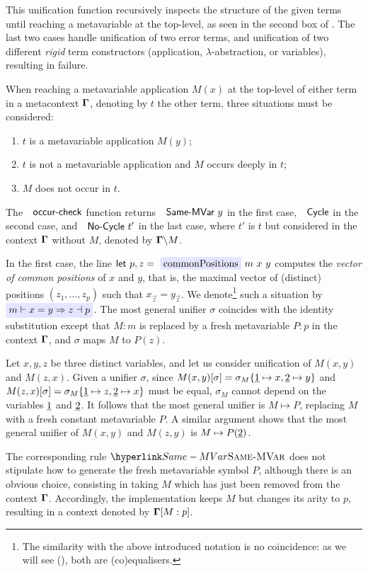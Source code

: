 This unification function recursively inspects the structure of the
given terms until reaching a metavariable at the top-level, as seen
in the second box of . The last two cases handle
unification of two error terms, and unification of two different \emph{rigid}
term constructors (application, $\lambda$-abstraction, or variables),
resulting in failure.

When reaching a metavariable application $M(x)$ at the top-level
of either term in a metacontext $\boldsymbol{\Gamma}$, denoting
by $t$ the other term, three situations must be considered:
\begin{enumerate}
\item $t$ is a metavariable application $M(y)$;
\item $t$ is not a metavariable application and $M$ occurs deeply in $t$;
\item $M$ does not occur in $t$.
\end{enumerate}
The $\AgdaFunction{occur-check}$ function returns $\AgdaInductiveConstructor{Same-MVar}\ y$
in the first case, $\AgdaInductiveConstructor{Cycle}$ in the second
case, and $\AgdaInductiveConstructor{No-Cycle}\ t'$ in the last case,
where $t'$ is $t$ but considered in the context $\boldsymbol{\Gamma}$
without $M$, denoted by $\boldsymbol{\Gamma}\backslash M$. 

 

In the first case, the line $\AgdaKeyword{let}\ p,z=\AgdaFunction{commonPositions}\ m\ x\ y$
computes the \emph{vector of common positions }of $x$ and $y$, that
is, the maximal vector of (distinct) positions $(z_{1},\dots,z_{p})$
such that $x_{\vec{z}}=y_{\vec{z}}$. We denote\footnote{The similarity with the above introduced notation is no coincidence:
as we will see (), both are (co)equalisers.} such a situation by $\highlighted{m\vdash x=y\Rightarrow z\dashv p}$.
The most general unifier $\sigma$ coincides with the identity substitution
except that $M:m$ is replaced by a fresh metavariable $P:p$ in the
context $\boldsymbol{\Gamma}$, and $\sigma$ maps $M$ to $P(z)$. 
\begin{example}
Let $x,y,z$ be three distinct variables, and let us consider unification
of $M(x,y)$ and $M(z,x)$. Given a unifier $\sigma$, since $M(x,y)[\sigma]=\sigma_{M}\{\underline{1}\mapsto x,\underline{2}\mapsto y\}$
and $M(z,x)[\sigma]=\sigma_{M}\{\underline{1}\mapsto z,\underline{2}\mapsto x\}$
must be equal, $\sigma_{M}$ cannot depend on the variables $\underline{1}$
and $\underline{2}$. It follows that the most general unifier is $M\mapsto P$,
replacing $M$ with a fresh constant metavariable $P$. A similar
argument shows that the most general unifier of $M(x,y)$ and $M(z,y)$
is $M\mapsto P(\underline{2})$.
\end{example}
The corresponding rule $\refrule{Same-MVar}$ does not stipulate how
to generate the fresh metavariable symbol $P$, although there is
an obvious choice, consisting in taking $M$ which has just been removed
from the context $\boldsymbol{\Gamma}$. Accordingly, the implementation
keeps $M$ but changes its arity to $p$, resulting in a context denoted
by $\boldsymbol{\Gamma}[M:p]$. 

